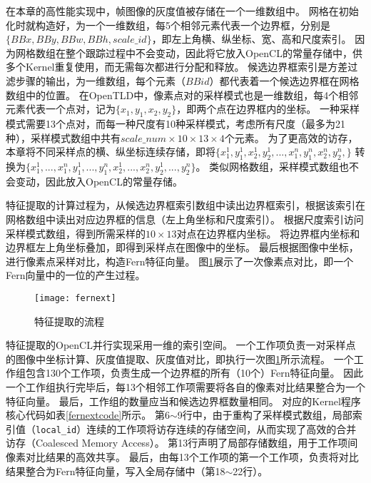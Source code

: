 在本章的高性能实现中，帧图像的灰度值被存储在一个一维数组中。
网格在初始化时就构造好，为一个一维数组，每5个相邻元素代表一个边界框，分别是$\{BBx, BBy, BBw, BBh, scale\_id\}$，即左上角横、纵坐标、宽、高和尺度索引。
因为网格数组在整个跟踪过程中不会变动，因此将它放入OpenCL的常量存储中，供多个Kernel重复使用，而无需每次都进行分配和释放。
候选边界框索引是方差过滤步骤的输出，为一维数组，每个元素（$BBid$）都代表着一个候选边界框在网格数组中的位置。
在OpenTLD中，像素点对的采样模式也是一维数组，每4个相邻元素代表一个点对，记为$\{x_1, y_1, x_2, y_2\}$，即两个点在边界框内的坐标。
一种采样模式需要13个点对，而每一种尺度有10种采样模式，考虑所有尺度（最多为21种），采样模式数组中共有$scale\_num
\times10\times13\times4$个元素。
为了更高效的访存，本章将不同采样点的横、纵坐标连续存储，即将$\{x^1_1, y^1_1, x^1_2, y^1_2, ...,x^n_1, y^n_1, x^n_2, y^n_2,\}$
转换为$\{x^1_1, ..., x^n_1, y^1_1, ... , y^n_1, x^1_2, ..., x^n_2, y^1_2, ..., y^n_2\}$。
类似网格数组，采样模式数组也不会变动，因此放入OpenCL的常量存储。

特征提取的计算过程为，从候选边界框索引数组中读出边界框索引，根据该索引在网格数组中读出对应边界框的信息（左上角坐标和尺度索引）。
根据尺度索引访问采样模式数组，得到所需采样的$10\times13$对点在边界框内坐标。
将边界框内坐标和边界框左上角坐标叠加，即得到采样点在图像中的坐标。
最后根据图像中坐标，进行像素点采样对比，构造Fern特征向量。
图\ref{fernext}展示了一次像素点对比，即一个Fern向量中的一位的产生过程。

\begin{figure}[htb]
  \centering
  \texttt{[image: fernext]}
  \caption{特征提取的流程}
  \label{fernext}
\end{figure}

特征提取的OpenCL并行实现采用一维的索引空间。
一个工作项负责一对采样点的图像中坐标计算、灰度值提取、灰度值对比，即执行一次图\ref{fernext}所示流程。
一个工作组包含130个工作项，负责生成一个边界框的所有（10个）Fern特征向量。
因此一个工作组执行完毕后，每13个相邻工作项需要将各自的像素对比结果整合为一个特征向量。
最后，工作组的数量应当和候选边界框数量相同。
对应的Kernel程序核心代码如表\ref{fernextcode}所示。
第6$\sim$9行中，由于重构了采样模式数组，局部索引值（\texttt{local\_id}）连续的工作项将访存连续的存储空间，从而实现了高效的合并访存（Coalesced Memory Access）。
第13行声明了局部存储数组，用于工作项间像素对比结果的高效共享。
最后，由每13个工作项的第一个工作项，负责将对比结果整合为Fern特征向量，写入全局存储中（第18$\sim$22行）。


